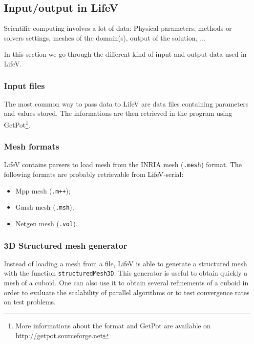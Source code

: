 \documentclass[11pt]{article}
\begin{document}

\subsection{Input/output in LifeV}
\label{sec:inOutput}
Scientific computing involves a lot of data: Physical parameters, methods or solvers settings, meshes of the domain(s), output of the solution, $\ldots$

In this section we go through the different kind of input and output data used in LifeV.

\subsubsection{Input files}
The most common way to pass data to LifeV are data files containing parameters and values stored. The informations are then retrieved in the program using GetPot\footnote{More informations about the format and GetPot are available on http://getpot.sourceforge.net}.

\subsubsection{Mesh formats}
LifeV contains parsers to load mesh from the INRIA mesh (\texttt{.mesh}) format. The following formats are probably retrievable from LifeV-serial:
\begin{itemize}
\item Mpp mesh (\texttt{.m++});
\item Gmsh mesh (\texttt{.msh});
\item Netgen mesh (\texttt{.vol}).
\end{itemize}

\subsubsection{3D Structured mesh generator}
Instead of loading a mesh from a file, LifeV is able to generate a structured mesh with the function \texttt{structuredMesh3D}. This generator is useful to obtain quickly a mesh of a cuboid. One can also use it to obtain several refinements of a cuboid in order to evaluate the scalability of parallel algorithms or to test convergence rates on test problems.
\end{document}
